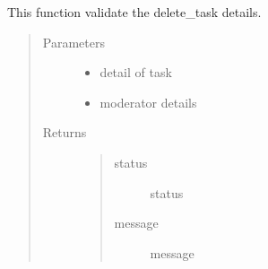\documentclass[letterpaper,10pt,english]{sphinxmanual}
\begin{document}

\begin{fulllineitems}
\label{\detokenize{janta:janta.viewhelper.validate_delete_task}}
This function validate the delete\_task details.
\begin{quote}\begin{description}
\item[{Parameters}] \leavevmode\begin{itemize}
\item {} 
 \textendash{} detail of task

\item {} 
 \textendash{} moderator details

\end{itemize}

\item[{Returns}] \leavevmode
\begin{quote}\begin{description}
\item[{status}] \leavevmode
status

\item[{message}] \leavevmode
message

\end{description}\end{quote}


\end{description}\end{quote}

\end{fulllineitems}

\end{document}

